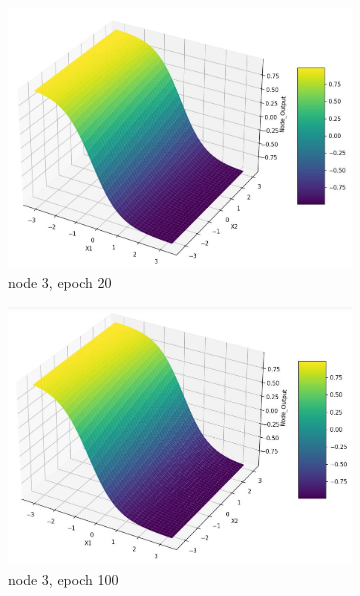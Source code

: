 \documentclass[11pt]{article}
\begin{document}
\begin{figure}[h]
\begin{subfigure}[b]{0.18\textwidth}
	\includegraphics[scale=0.14]{hidden1_n3_e20.jpg}
	\caption{node 3, epoch 20}
	\label{fig:fig2.1.4.13}
	\end{subfigure}
	\begin{subfigure}[b]{0.18\textwidth}
	\centering
	\includegraphics[scale=0.14]{hidden1_n3_e100.jpg}
	\caption{node 3, epoch 100}
	\label{fig:fig2.1.4.14}
	\end{subfigure}
	\begin{subfigure}[b]{0.18\textwidth}
	\centering

\end{subfigure}
\end{figure}
\end{document}
